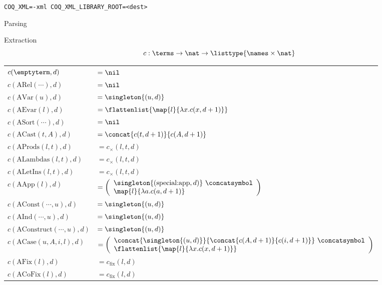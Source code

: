 \begin{frame}{\xml}
	\lstinline{COQ_XML=-xml COQ_XML_LIBRARY_ROOT=<dest>}
	
\end{frame}

\begin{frame}{Parsing}
	
\end{frame}

\begin{frame}{Extraction}
	\vspace{-2.55em}
	\[c : \terms \rightarrow \nat \rightarrow \listtype{\names \times \nat} \]
	\bigskip
	\hspace{-1.7em}
	\begin{tabularx}{\textwidth}{ll}
		$c(\emptyterm, d)$              & $ = \nil $ \\
		$c(\text{ARel}(\cdots), d)$     & $ = \nil $ \\
		$c(\text{AVar}(u), d)$          & $ = \singleton{(u, d)} $ \\
		$c(\text{AEvar}(l), d)$         & $ = \flattenlist{\map{l}{\lambda x . c(x, d+1)}} $ \\
		$c(\text{ASort}(\cdots), d)$    & $ = \nil $ \\
		$c(\text{ACast}(t, A), d)$      & $ = \concat{c(t, d+1)}{c(A, d+1)} $ \\
		$c(\text{AProds}(l, t), d)$     & $ = c_{\times}(l, t, d) $ \\
		$c(\text{ALambdas}(l, t), d)$   & $ = c_{\times}(l, t, d) $ \\
		$c(\text{ALetIns}(l, t), d)$    & $ = c_{\times}(l, t, d) $ \\
		$c(\text{AApp}(l), d)$  & $ = \left(
		  \begin{array}{l}
			\singleton{(\text{special:app}, d)} ~\concatsymbol \\
			\map{l}{ \lambda a . c(a, d+1) }
		  \end{array}
		  \right)
		  $ \\
		$c(\text{AConst}(\cdots, u), d)$  & $ = \singleton{(u, d)} $ \\
		$c(\text{AInd}(\cdots, u), d)$  & $ = \singleton{(u, d)} $ \\
		$c(\text{AConstruct}(\cdots, u), d)$  & $ = \singleton{(u, d)} $ \\
		$c(\text{ACase}(u, A, i, l), d)$  &
		  $= \left(
			\begin{array}{l}
			  \concat{\singleton{(u, d)}}{
				\concat{c(A, d+1)}{c(i, d+1)}
			  }
			  ~\concatsymbol \\
			  \flattenlist{ \map{l}{\lambda x . c(x, d+1)} } \\
			\end{array}
			\right)
		  $ \\
		$c(\text{AFix}(l), d)$        & $ = c_{\text{fix}}(l, d) $ \\
		$c(\text{ACoFix}(l), d)$      & $ = c_{\text{fix}}(l, d) $ \\
	\end{tabularx}
\end{frame}

